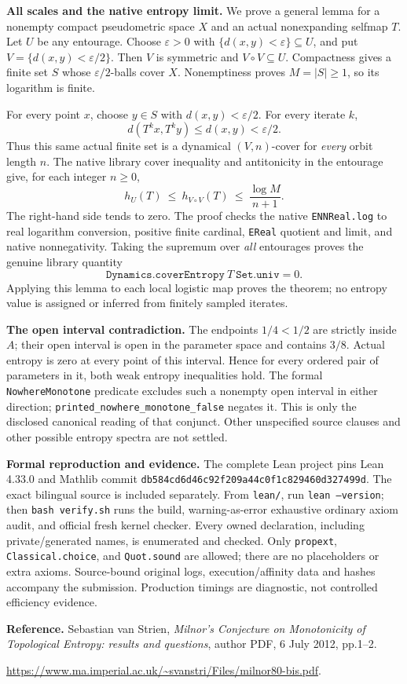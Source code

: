 \documentclass[11pt,a4paper]{article}
\begin{document}
\newpage
\textbf{All scales and the native entropy limit.}
We prove a general lemma for a nonempty compact pseudometric space \(X\) and
an actual nonexpanding selfmap \(T\). Let \(U\) be any entourage. Choose
\(\varepsilon>0\) with \(\{d(x,y)<\varepsilon\}\subseteq U\), and put
\(V=\{d(x,y)<\varepsilon/2\}\). Then \(V\) is symmetric and
\(V\circ V\subseteq U\). Compactness gives a finite set \(S\) whose
\(\varepsilon/2\)-balls cover \(X\). Nonemptiness proves
\(M=|S|\ge1\), so its logarithm is finite.

For every point \(x\), choose \(y\in S\) with
\(d(x,y)<\varepsilon/2\). For every iterate \(k\),
\[
 d(T^k x,T^k y)\le d(x,y)<\varepsilon/2.
\]
Thus this same actual finite set is a dynamical \((V,n)\)-cover for
\emph{every} orbit length \(n\). The native library cover inequality and
antitonicity in the entourage give, for each integer \(n\ge0\),
\[
 h_U(T)\ \le\ h_{V\circ V}(T)
       \ \le\ \frac{\log M}{n+1}.
\]
The right-hand side tends to zero. The proof checks the native
\texttt{ENNReal.log} to real logarithm conversion, positive finite cardinal,
\texttt{EReal} quotient and limit, and native nonnegativity. Taking the
supremum over \emph{all} entourages proves the genuine library quantity
\[
 \texttt{Dynamics.coverEntropy}\ T\ \texttt{Set.univ}=0.
\]
Applying this lemma to each local logistic map proves the theorem; no entropy
value is assigned or inferred from finitely sampled iterates.

\textbf{The open interval contradiction.}
The endpoints \(1/4<1/2\) are strictly inside \(A\); their open interval is
open in the parameter space and contains \(3/8\). Actual entropy is zero at
every point of this interval. Hence for every ordered pair of parameters in
it, both weak entropy inequalities hold. The formal
\texttt{NowhereMonotone} predicate excludes such a nonempty open interval in
either direction; \texttt{printed\_nowhere\_monotone\_false} negates it.
This is only the disclosed canonical reading of that conjunct. Other
unspecified source clauses and other possible entropy spectra are not settled.

\textbf{Formal reproduction and evidence.}
The complete Lean project pins Lean 4.33.0 and Mathlib commit
\texttt{db584cd6d46c92f209a44c0f1c829460d327499d}. The exact bilingual source
is included separately. From \texttt{lean/}, run \texttt{lean --version}; then
\texttt{bash verify.sh} runs the build, warning-as-error exhaustive ordinary
axiom audit, and official fresh kernel checker. Every owned declaration,
including private/generated names, is enumerated and checked. Only
\texttt{propext}, \texttt{Classical.choice}, and \texttt{Quot.sound} are allowed;
there are no placeholders or extra axioms. Source-bound original logs,
execution/affinity data and hashes accompany the submission. Production
timings are diagnostic, not controlled efficiency evidence.

\textbf{Reference.}
Sebastian van Strien, \emph{Milnor's Conjecture on Monotonicity of Topological
Entropy: results and questions}, author PDF, 6 July 2012, pp.1--2.
\par
\url{https://www.ma.imperial.ac.uk/~svanstri/Files/milnor80-bis.pdf}.
\end{document}
